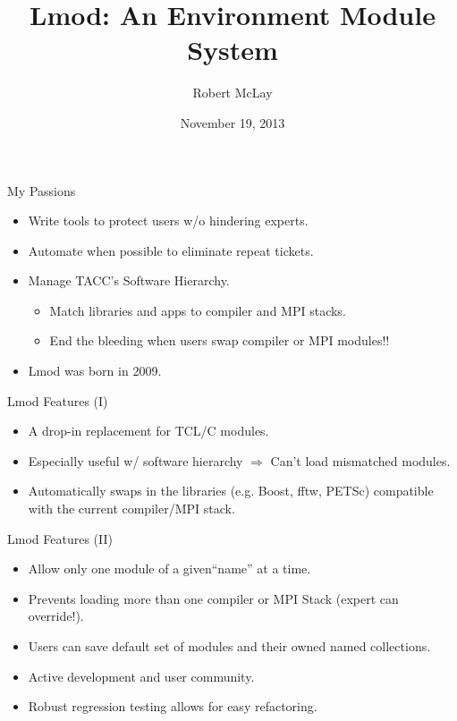 \documentclass{beamer}
\title{Lmod: An Environment Module System}
\author{Robert McLay}
\institute{The Texas Advanced Computing Center}
\date{November 19, 2013}  %
\begin{document}
\begin{frame}
  \titlepage
\end{frame}

\begin{frame}{My Passions}
  \begin{itemize}
    \item Write tools to protect users w/o hindering experts.
    \item Automate when possible to eliminate repeat tickets.
    \item Manage TACC's Software Hierarchy.
      \begin{itemize}
        \item Match libraries and apps to compiler and MPI stacks.
        \item End the bleeding  when users swap compiler or MPI modules!!
      \end{itemize}
    \item Lmod was born in 2009.
      
  \end{itemize}
\end{frame}

\begin{frame}{Lmod Features (I)}
  \begin{itemize}
    \item A drop-in replacement for TCL/C modules.
    \item Especially useful w/ software hierarchy $\Rightarrow$ Can't
      load mismatched modules.
    \item Automatically swaps in the libraries (e.g. Boost, fftw,
      PETSc) compatible with the current compiler/MPI stack.
  \end{itemize}
\end{frame}

\begin{frame}{Lmod Features (II)}
  \begin{itemize}
    \item Allow only one module of a given``name'' at a time.
    \item Prevents loading more than one compiler or
      MPI Stack (expert can override!).
    \item Users can save default set of modules and their owned  named collections.
    \item Active development and user community.
    \item Robust regression testing allows for easy refactoring.
  \end{itemize}
\end{frame}
\end{document}
